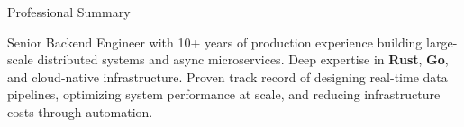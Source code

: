 \documentclass{resume} %
\begin{document}

\address{+381 61 6122795 Belgrade, Serbia \href{mailto:borisyegorov8@gmail.com}{borisyegorov8@gmail.com} \href{https://linkedin.com/in/barys-yahorau-49aba4a0}{linkedin.com/in/barys-yahorau-49aba4a0}
}


\begin{rSection}{Professional Summary}

Senior Backend Engineer with 10+ years of production experience building large-scale distributed systems and async microservices. Deep expertise in \textbf{Rust}, \textbf{Go}, and cloud-native infrastructure. Proven track record of designing real-time data pipelines, optimizing system performance at scale, and reducing infrastructure costs through automation.

\end{rSection}

\end{document}
